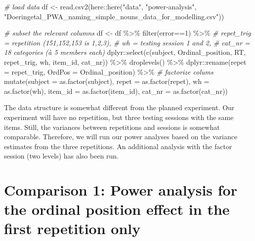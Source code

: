 \documentclass[
]{article}
\newenvironment{Shaded}{\begin{snugshade}}{\end{snugshade}}
\newcommand{\AttributeTok}[1]{\textcolor[rgb]{0.77,0.63,0.00}{#1}}
\newcommand{\CommentTok}[1]{\textcolor[rgb]{0.56,0.35,0.01}{\textit{#1}}}
\newcommand{\DecValTok}[1]{\textcolor[rgb]{0.00,0.00,0.81}{#1}}
\newcommand{\FunctionTok}[1]{\textcolor[rgb]{0.00,0.00,0.00}{#1}}
\newcommand{\NormalTok}[1]{#1}
\newcommand{\OtherTok}[1]{\textcolor[rgb]{0.56,0.35,0.01}{#1}}
\newcommand{\SpecialCharTok}[1]{\textcolor[rgb]{0.00,0.00,0.00}{#1}}
\newcommand{\StringTok}[1]{\textcolor[rgb]{0.31,0.60,0.02}{#1}}
\begin{document}
\begin{Shaded}
\begin{Highlighting}[]
\CommentTok{\# load data}
\NormalTok{df }\OtherTok{\textless{}{-}} \FunctionTok{read.csv2}\NormalTok{(here}\SpecialCharTok{::}\FunctionTok{here}\NormalTok{(}\StringTok{"data"}\NormalTok{, }\StringTok{"power{-}analysis"}\NormalTok{,}
                \StringTok{"Doeringetal\_PWA\_naming\_simple\_nouns\_data\_for\_modelling.csv"}\NormalTok{))}

\CommentTok{\# subset the relevant columns}
\NormalTok{df }\OtherTok{\textless{}{-}}\NormalTok{ df }\SpecialCharTok{\%\textgreater{}\%} 
  \FunctionTok{filter}\NormalTok{(error}\SpecialCharTok{==}\DecValTok{1}\NormalTok{) }\SpecialCharTok{\%\textgreater{}\%} 
    \CommentTok{\# repet\_trig = repetition (151,152,153 is 1,2,3), }
    \CommentTok{\# wh = testing session 1 and 2, }
    \CommentTok{\# cat\_nr = 18 categories (à 5 members each)}
\NormalTok{  dplyr}\SpecialCharTok{::}\FunctionTok{select}\NormalTok{(}\FunctionTok{c}\NormalTok{(subject, Ordinal\_position, RT, }
\NormalTok{                  repet\_trig, wh, item\_id, cat\_nr)) }\SpecialCharTok{\%\textgreater{}\%}
  \FunctionTok{droplevels}\NormalTok{() }\SpecialCharTok{\%\textgreater{}\%} 
\NormalTok{  dplyr}\SpecialCharTok{::}\FunctionTok{rename}\NormalTok{(}\AttributeTok{repet =}\NormalTok{ repet\_trig, }
                \AttributeTok{OrdPos =}\NormalTok{ Ordinal\_position) }\SpecialCharTok{\%\textgreater{}\%} 
  \CommentTok{\# factorize colums}
  \FunctionTok{mutate}\NormalTok{(}\AttributeTok{subject =} \FunctionTok{as.factor}\NormalTok{(subject),}
         \AttributeTok{repet =} \FunctionTok{as.factor}\NormalTok{(repet), }
         \AttributeTok{wh =} \FunctionTok{as.factor}\NormalTok{(wh), }
         \AttributeTok{item\_id =} \FunctionTok{as.factor}\NormalTok{(item\_id),}
         \AttributeTok{cat\_nr =} \FunctionTok{as.factor}\NormalTok{(cat\_nr))}
\end{Highlighting}
\end{Shaded}

The data structure is somewhat different from the planned experiment.
Our experiment will have no repetition, but three testing sessions with
the same items. Still, the variances between repetitions and sessions is
somewhat comparable. Therefore, we will run our power analyses based on
the variance estimates from the three repetitions. An additional
analysis with the factor session (two levels) has also been run.

\hypertarget{comparison-1-power-analysis-for-the-ordinal-position-effect-in-the-first-repetition-only}{%
\section{Comparison 1: Power analysis for the ordinal position effect in
the first repetition
only}\label{comparison-1-power-analysis-for-the-ordinal-position-effect-in-the-first-repetition-only}}
\end{document}
